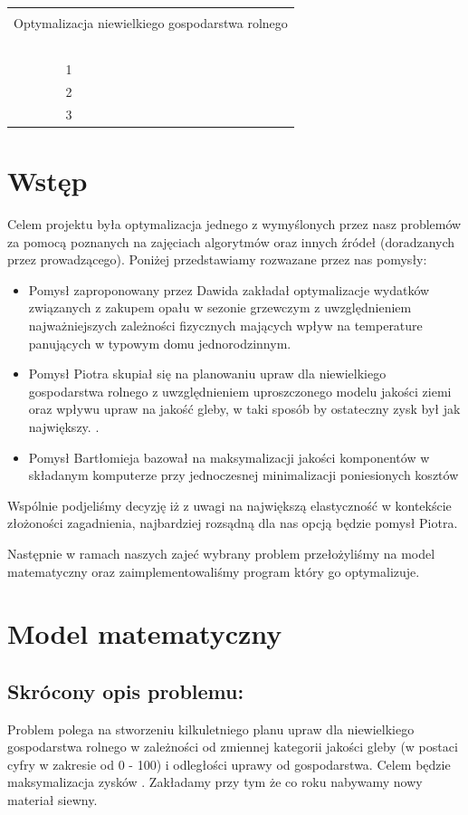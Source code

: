 \documentclass{article}
\newcommand{\AASprTab}[5]{


\begin{center}
\begin{tabular}{ p{0.06\textwidth} p{0.2\textwidth} p{0.2\textwidth} p{0.2\textwidth} p{0.2\textwidth} p{0.2\textwidth} }

  &   &   &   &   \\
\hline
\multicolumn{6}{|c|}{}\\[-1ex]
\multicolumn{6}{|c|}{{\LARGE Optymalizacja niewielkiego gospodarstwa rolnego}} \\
\multicolumn{6}{|c|}{}\\[-1ex]



\hline
\multicolumn{2}{|l|}{\AASprTabFieldDsc{Wydział}} & \multicolumn{2}{|l|}{\AASprTabFieldDsc{Kierunek}} & \multicolumn{2}{|l|}{\AASprTabFieldDsc{Rok}} \\
\multicolumn{2}{|c|}{\AASprTabFieldVar{EAIiIB}} & \multicolumn{2}{|c|}{\AASprTabFieldVar{Automatyka i Robotyka}} & \multicolumn{2}{|c|}{\AASprTabFieldVar{III}} \\



\hline
\multicolumn{1}{|c|}{\tiny{ }} &
\multicolumn{5}{|c|}{\tiny{ }} \\
\multicolumn{1}{|c|}{\AASprTabFieldDscH{L.p.}} &
\multicolumn{5}{|l|}{\AASprTabFieldDscH{Skład grupy ćwiczeniowej}}\\

\hline
\multicolumn{1}{|c|}{1} &
\multicolumn{5}{|l|}{\AASprTabFieldVar{#3}}\\

\hline
\multicolumn{1}{|c|}{2} &
\multicolumn{5}{|l|}{\AASprTabFieldVar{#4}}\\

\hline
\multicolumn{1}{|c|}{3} &
\multicolumn{5}{|l|}{\AASprTabFieldVar{#5}}\\

\hline
\end{tabular}
\end{center}
}
\begin{document}
\AASprTab { tabela1 }{1 stycznia 2022 r.}{Bartłomiej Matuszewski}{Piotr Mamos}{Dawid Maziarski}

\tableofcontents
\newpage
\section{Wstęp}
Celem projektu była optymalizacja jednego z wymyślonych przez nasz problemów za pomocą poznanych na zajęciach algorytmów oraz innych źródeł (doradzanych przez prowadzącego).
Poniżej przedstawiamy rozwazane przez nas pomysły:
\begin{itemize}
	\item Pomysł zaproponowany przez Dawida zakładał optymalizacje wydatków związanych z zakupem opału w sezonie grzewczym z uwzględnieniem najważniejszych zależności fizycznych mających wpływ na temperature panujących w typowym domu jednorodzinnym.
	\item Pomysł Piotra skupiał się na planowaniu upraw dla niewielkiego gospodarstwa rolnego z uwzględnieniem uproszczonego modelu jakości ziemi oraz wpływu upraw na jakość gleby, w taki sposób by ostateczny zysk był jak największy. .
	\item Pomysł Bartłomieja bazował na maksymalizacji jakości komponentów w składanym komputerze przy jednoczesnej minimalizacji poniesionych kosztów
\end{itemize}

Wspólnie podjeliśmy decyzję iż z uwagi na największą elastyczność w kontekście złożoności zagadnienia, najbardziej rozsądną dla nas opcją będzie pomysł Piotra.

Następnie w ramach naszych zajeć wybrany problem przełożyliśmy na model matematyczny oraz zaimplementowaliśmy program który go optymalizuje.

\section{Model matematyczny}

	\subsection{Skrócony opis problemu:}
	Problem polega na stworzeniu kilkuletniego planu upraw dla niewielkiego gospodarstwa rolnego w zależności od zmiennej kategorii jakości gleby (w postaci cyfry w zakresie od 0 - 100) i  odległości uprawy od gospodarstwa. Celem będzie maksymalizacja zysków . Zakładamy przy tym że co roku nabywamy nowy materiał siewny.
\end{document}
